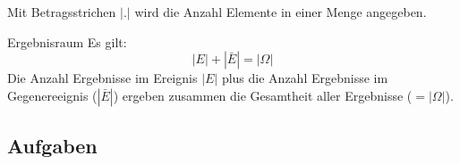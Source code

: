 \begin{definition}{}{}
Mit Betragsstrichen $|.|$ wird die Anzahl Elemente in einer Menge angegeben.
\end{definition}

\begin{bemerkung}{Ergebnisraum}{}
  Es gilt: $$|E| + |{\bar{E}}| = |\Omega|$$
  Die Anzahl Ergebnisse im Ereignis $|E|$ plus die Anzahl Ergebnisse im Gegenereeignis ($|\bar{E}|$) ergeben zusammen die Gesamtheit aller Ergebnisse ($=|\Omega|$).
\end{bemerkung}

\subsection*{Aufgaben}

\newpage
